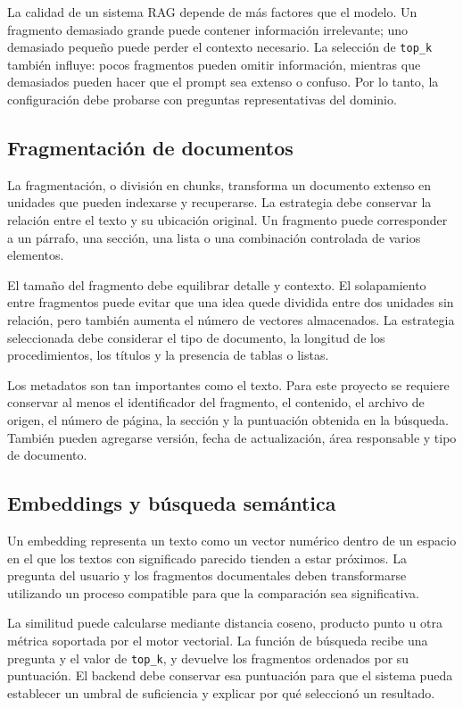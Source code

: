 La calidad de un sistema RAG depende de más factores que el modelo. Un fragmento demasiado grande puede contener información irrelevante; uno demasiado pequeño puede perder el contexto necesario. La selección de \texttt{top\_k} también influye: pocos fragmentos pueden omitir información, mientras que demasiados pueden hacer que el prompt sea extenso o confuso. Por lo tanto, la configuración debe probarse con preguntas representativas del dominio.

\subsection{Fragmentación de documentos}

La fragmentación, o división en chunks, transforma un documento extenso en unidades que pueden indexarse y recuperarse. La estrategia debe conservar la relación entre el texto y su ubicación original. Un fragmento puede corresponder a un párrafo, una sección, una lista o una combinación controlada de varios elementos.

El tamaño del fragmento debe equilibrar detalle y contexto. El solapamiento entre fragmentos puede evitar que una idea quede dividida entre dos unidades sin relación, pero también aumenta el número de vectores almacenados. La estrategia seleccionada debe considerar el tipo de documento, la longitud de los procedimientos, los títulos y la presencia de tablas o listas.

Los metadatos son tan importantes como el texto. Para este proyecto se requiere conservar al menos el identificador del fragmento, el contenido, el archivo de origen, el número de página, la sección y la puntuación obtenida en la búsqueda. También pueden agregarse versión, fecha de actualización, área responsable y tipo de documento.

\subsection{Embeddings y búsqueda semántica}

Un embedding representa un texto como un vector numérico dentro de un espacio en el que los textos con significado parecido tienden a estar próximos. La pregunta del usuario y los fragmentos documentales deben transformarse utilizando un proceso compatible para que la comparación sea significativa.

La similitud puede calcularse mediante distancia coseno, producto punto u otra métrica soportada por el motor vectorial. La función de búsqueda recibe una pregunta y el valor de \texttt{top\_k}, y devuelve los fragmentos ordenados por su puntuación. El backend debe conservar esa puntuación para que el sistema pueda establecer un umbral de suficiencia y explicar por qué seleccionó un resultado.

